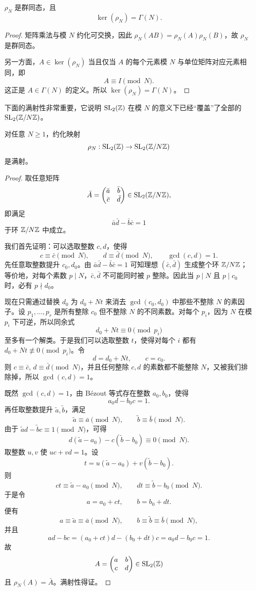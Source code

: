 \begin{proposition}
$\rho_N$ 是群同态，且
\[
\ker(\rho_N)=\Gamma(N).
\]
\end{proposition}

\begin{proof}
矩阵乘法与模 $N$ 约化可交换，因此 $\rho_N(AB)=\rho_N(A)\rho_N(B)$，故 $\rho_N$ 是群同态。

另一方面，$A\in \ker(\rho_N)$ 当且仅当 $A$ 的每个元素模 $N$ 与单位矩阵对应元素相同，即
\[
A\equiv I \pmod N.
\]
这正是 $A\in \Gamma(N)$ 的定义。所以 $\ker(\rho_N)=\Gamma(N)$。
\end{proof}

下面的满射性非常重要，它说明 $\mathrm{SL}_2(\mathbb{Z})$ 在模 $N$ 的意义下已经“覆盖”了全部的 $\mathrm{SL}_2(\mathbb{Z}/N\mathbb{Z})$。

\begin{theorem}
对任意 $N\ge 1$，约化映射
\[
\rho_N:\mathrm{SL}_2(\mathbb{Z})\to \mathrm{SL}_2(\mathbb{Z}/N\mathbb{Z})
\]
是满射。
\end{theorem}

\begin{proof}
取任意矩阵
\[
\bar A=\begin{pmatrix} \bar a&\bar b\\ \bar c&\bar d \end{pmatrix}\in \mathrm{SL}_2(\mathbb{Z}/N\mathbb{Z}),
\]
即满足
\[
\bar a\bar d-\bar b\bar c=1
\]
于环 $\mathbb{Z}/N\mathbb{Z}$ 中成立。

我们首先证明：可以选取整数 $c,d$，使得
\[
c\equiv \bar c\pmod N,
\qquad d\equiv \bar d\pmod N,
\qquad \gcd(c,d)=1.
\]
先任意取整数提升 $c_0,d_0$。由 $\bar a\bar d-\bar b\bar c=1$ 可知理想 $(\bar c,\bar d)$ 生成整个环 $\mathbb{Z}/N\mathbb{Z}$；等价地，对每个素数 $p\mid N$，$\bar c,\bar d$ 不可能同时被 $p$ 整除。因此当 $p\mid N$ 且 $p\mid c_0$ 时，必有 $p\nmid d_0$。

现在只需通过替换 $d_0$ 为 $d_0+Nt$ 来消去 $\gcd(c_0,d_0)$ 中那些不整除 $N$ 的素因子。设 $p_1,\dots,p_r$ 是所有整除 $c_0$ 但不整除 $N$ 的不同素数。对每个 $p_i$，因为 $N$ 在模 $p_i$ 下可逆，所以同余式
\[
d_0+Nt\equiv 0\pmod{p_i}
\]
至多有一个解类。于是我们可以选取整数 $t$，使得对每个 $i$ 都有 $d_0+Nt\not\equiv 0\pmod{p_i}$。令
\[
d=d_0+Nt,
\qquad c=c_0.
\]
则 $c\equiv \bar c$, $d\equiv \bar d\pmod N$，并且任何整除 $c,d$ 的素数都不能整除 $N$，又被我们排除掉，所以 $\gcd(c,d)=1$。

既然 $\gcd(c,d)=1$，由 Bézout 等式存在整数 $a_0,b_0$，使得
\[
a_0d-b_0c=1.
\]
再任取整数提升 $\tilde a,\tilde b$，满足
\[
\tilde a\equiv \bar a\pmod N,
\qquad \tilde b\equiv \bar b\pmod N.
\]
由于 $\tilde a d-\tilde b c\equiv 1\pmod N$，可得
\[
d(\tilde a-a_0)-c(\tilde b-b_0)\equiv 0\pmod N.
\]
取整数 $u,v$ 使 $uc+vd=1$。设
\[
t=u(\tilde a-a_0)+v(\tilde b-b_0).
\]
则
\[
ct\equiv \tilde a-a_0 \pmod N,
\qquad
dt\equiv \tilde b-b_0 \pmod N.
\]
于是令
\[
a=a_0+ct,
\qquad b=b_0+dt.
\]
便有
\[
a\equiv \tilde a\equiv \bar a\pmod N,
\qquad b\equiv \tilde b\equiv \bar b\pmod N,
\]
并且
\[
ad-bc=(a_0+ct)d-(b_0+dt)c=a_0d-b_0c=1.
\]
故
\[
A=\begin{pmatrix} a&b\\ c&d \end{pmatrix}\in \mathrm{SL}_2(\mathbb{Z})
\]
且 $\rho_N(A)=\bar A$。满射性得证。
\end{proof}

